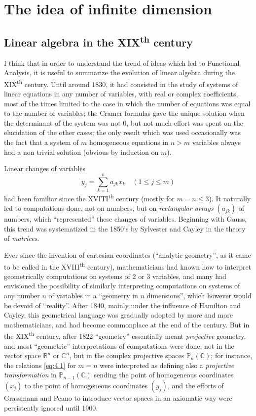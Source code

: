 \documentclass[12pt,a4paper,leqno,twoside]{extbook}
\newcommand{\supth}{\texorpdfstring{\textsuperscript{th}}{th}}
\newcommand{\C}{\mathbb{C}}
\newcommand{\R}{\mathbb{R}}
\begin{document}
\chapter{The idea of infinite dimension}
\label{ch:4}
\setcounter{equation}{0}

\section{Linear algebra in the XIX\supth{} century}
\label{sec:4.1}

I think that in order to understand the trend of ideas which led to Functional Analysis, it is useful to summarize the evolution of linear algebra during the XIX\supth{} century. Until around 1830, it had consisted in the study of systems of linear equations in any number of variables, with real or complex coefficients, most of the times limited to the case in which the number of equations was equal to the number of variables; the Cramer formulas gave the unique solution when the determinant of the system was not 0, but not much effort was spent on the elucidation of the other cases; the only result which was used occasionally was the fact that a system of \(m\) homogeneous equations in \(n > m\) variables always had a non trivial solution (obvious by induction on \(m\)).

Linear changes of variables
\begin{equation}
    \label{eq:4.1}
    y_j = \sum_{k=1}^n a_{jk} x_k \quad (1 \leq j \leq m)
\end{equation}
had been familiar since the XVITI\supth{} century (mostly for \(m=n \leq 3\)). It naturally led to computations done, not on numbers, but on \emph{rectangular arrays} \((a_{jk})\) of numbers, which ``represented'' these changes of variables. Beginning with Gauss, this trend was systematized in the 1850's by Sylvester and Cayley in the theory of \emph{matrices}.

Ever since the invention of cartesian coordinates (``analytic geometry'', as it came to be called in the XVIII\supth{} century), mathematicians had known how to interpret geometrically computations on systems of 2 or 3 variables, and many had envisioned the possibility of similarly interpreting computations on systems of any number \(n\) of variables in a ``geometry in \(n\) dimensions'', which however would be devoid of ``reality''. After 1840, mainly under the influence of Hamilton and Cayley, this geometrical language was gradually adopted by more and more mathematicians, and had become commonplace at the end of the century. But in the XIX\supth{} century, after 1822 ``geometry'' essentially meant \emph{projective} geometry, and most ``geometric'' interpretations of computations were done, not in the vector space \(\R^n\) or \(\C^n\), but in the complex projective spaces \(\mathbb{P}_n(\C)\); for instance, the relations \eqref{eq:4.1} for \(m = n\) were interpreted as defining also a \emph{projective transformation} in \(\mathbb{P}_{n-1}(\C)\) sending the point of homogeneous coordinates \((x_j)\) to the point of homogeneous coordinates \((y_j)\), and the efforts of Grassmann and Peano to introduce vector spaces in an axiomatic way were persistently ignored until 1900.
\end{document}

